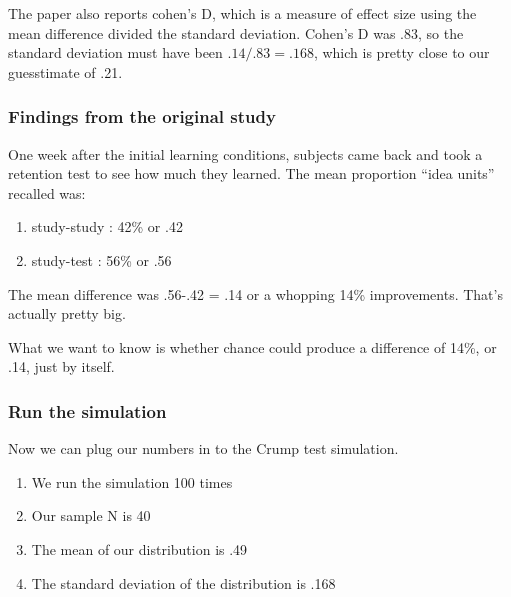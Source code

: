 \documentclass[]{book}
\providecommand{\tightlist}{%
  \setlength{\itemsep}{0pt}\setlength{\parskip}{0pt}}
\begin{document}
The paper also reports cohen's D, which is a measure of effect size
using the mean difference divided the standard deviation. Cohen's D was
.83, so the standard deviation must have been \(.14/.83 = .168\), which
is pretty close to our guesstimate of .21.

\subsubsection{Findings from the original
study}\label{findings-from-the-original-study}

One week after the initial learning conditions, subjects came back and
took a retention test to see how much they learned. The mean proportion
``idea units'' recalled was:

\begin{enumerate}
\def\labelenumi{\arabic{enumi}.}
\tightlist
\item
  study-study : 42\% or .42
\item
  study-test : 56\% or .56
\end{enumerate}

The mean difference was .56-.42 = .14 or a whopping 14\% improvements.
That's actually pretty big.

What we want to know is whether chance could produce a difference of
14\%, or .14, just by itself.

\subsubsection{Run the simulation}\label{run-the-simulation}

Now we can plug our numbers in to the Crump test simulation.

\begin{enumerate}
\def\labelenumi{\arabic{enumi}.}
\tightlist
\item
  We run the simulation 100 times
\item
  Our sample N is 40
\item
  The mean of our distribution is .49
\item
  The standard deviation of the distribution is .168
\end{enumerate}
\end{document}
